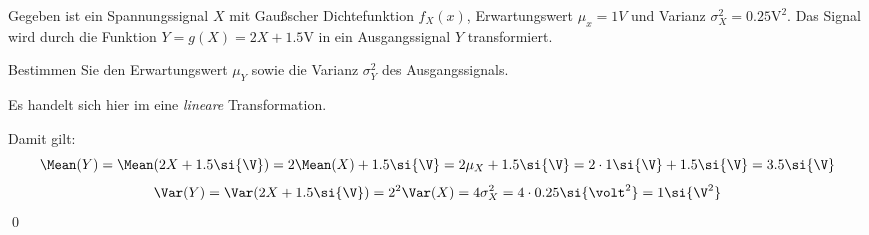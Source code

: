 \documentclass{abgabe}
\begin{document}
\begin{questions}
    \question
    Gegeben ist ein Spannungssignal $X$ mit Gaußscher Dichtefunktion $f_X(x)$, Erwartungswert $\mu_x = 1\si{V}$ und Varianz $\sigma_X^2 = 0.25\si{\volt}^2$. 
    Das Signal wird durch die Funktion $Y = g(X) = 2X + 1.5\si{\V}$ in ein Ausgangssignal $Y$ transformiert.
    
    Bestimmen Sie den Erwartungswert $\mu_Y$ sowie die Varianz $\sigma^2_Y$ des Ausgangssignals.
    \begin{solution}
        Es handelt sich hier im eine \emph{lineare} Transformation. 
        
        Damit gilt: 
        \[ 
            \Mean(Y) = \Mean(2X + 1.5\si{\V}) = 2\Mean(X) + 1.5\si{\V} = 2\mu_X + 1.5\si{\V} = 2 \cdot 1\si{\V} + 1.5\si{\V} = 3.5\si{\V}
        \]
        \[
            \Var(Y) = \Var(2X + 1.5\si{\V}) = 2^2 \Var(X) = 4 \sigma_X^2 = 4 \cdot 0.25\si{\volt^2} = 1\si{\V^2}
        \]
        \qed
    \end{solution}
\end{questions}
\end{document}
